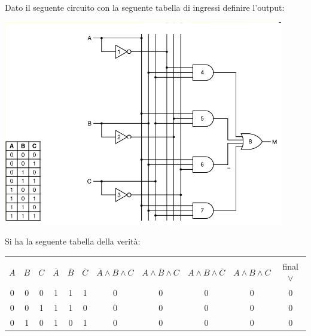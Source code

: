 \documentclass[a4paper,12pt, oneside]{book}
\begin{document}
\begin{esercizio}
	Dato il seguente circuito con la seguente tabella di ingressi definire l'output:
	\begin{center}
		\includegraphics[scale=0.6]{img/es2.png}
	\end{center}
	Si ha la seguente tabella della verità:
	\begin{center}
		\begin{tabular}{|c|c|c|c|c|c|c|c|c|c|c|}
			\hline
			    &     &     &                &                &                &                                &                                &                               &                     &              \\
			$A$ & $B$ & $C$ & $\overline{A}$ & $\overline{B}$ & $\overline{C}$ & $\overline{A}\wedge B\wedge C$ & $A\wedge \overline{B}\wedge C$ & $A\wedge B\wedge\overline{C}$ & $A\wedge B\wedge C$ & final $\vee$ \\
			\hline
			0   & 0   & 0   & 1              & 1              & 1              & 0                              & 0                              & 0                             & 0                   & 0            \\
			\hline
			0   & 0   & 1   & 1              & 1              & 0              & 0                              & 0                              & 0                             & 0                   & 0            \\
			\hline
			0   & 1   & 0   & 1              & 0              & 1              & 0                              & 0                              & 0                             & 0                   & 0            \\
			\hline

\end{tabular}
\end{center}
\end{esercizio}
\end{document}
